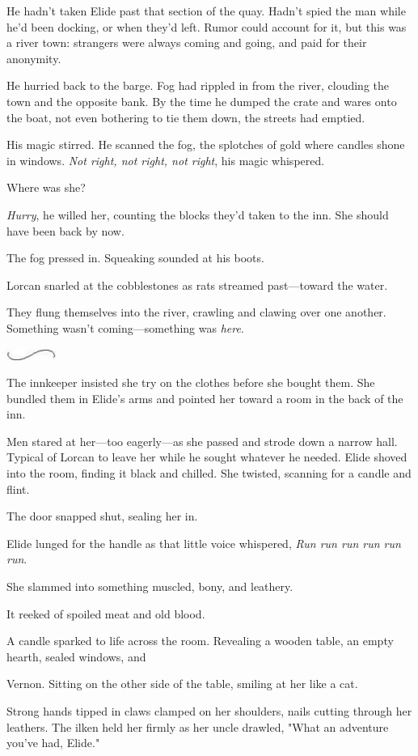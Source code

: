 He hadn't taken Elide past that section of the quay.
Hadn't spied the man while he'd been docking, or when they'd left.
Rumor could account for it, but this was a river town: strangers were always coming and going, and paid for their anonymity.

He hurried back to the barge.
Fog had rippled in from the river, clouding the town and the opposite bank.
By the time he dumped the crate and wares onto the boat, not even bothering to tie them down, the streets had emptied.

His magic stirred.
He scanned the fog, the splotches of gold where candles shone in windows.
\emph{Not right, not right, not right}, his magic whispered.

Where was she?

\emph{Hurry}, he willed her, counting the blocks they'd taken to the inn.
She should have been back by now.

The fog pressed in.
Squeaking sounded at his boots.

Lorcan snarled at the cobblestones as rats streamed past---toward the water.

They flung themselves into the river, crawling and clawing over one another.
Something wasn't coming---something was \emph{here}.

\begin{center}
	\includegraphics[width=0.65in,height=0.13in]{images/seperator}
\end{center}

The innkeeper insisted she try on the clothes before she bought them.
She bundled them in Elide's arms and pointed her toward a room in the back of the inn.

Men stared at her---too eagerly---as she passed and strode down a narrow hall.
Typical of Lorcan to leave her while he sought whatever he needed.
Elide shoved into the room, finding it black and chilled.
She twisted, scanning for a candle and flint.

The door snapped shut, sealing her in.

Elide lunged for the handle as that little voice whispered, \emph{Run run run run run run}.

She slammed into something muscled, bony, and leathery.

It reeked of spoiled meat and old blood.

A candle sparked to life across the room.
Revealing a wooden table, an empty hearth, sealed windows, and 

Vernon.
Sitting on the other side of the table, smiling at her like a cat.

Strong hands tipped in claws clamped on her shoulders, nails cutting through her leathers.
The ilken held her firmly as her uncle drawled, "What an adventure you've had, Elide."
